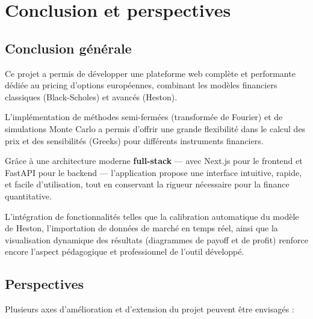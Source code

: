 \chapter*{Conclusion et perspectives}
\label{sec:conclusion}

\section*{Conclusion générale}

Ce projet a permis de développer une plateforme web complète et performante dédiée au pricing d'options européennes, combinant les modèles financiers classiques (Black-Scholes) et avancés (Heston). 

L'implémentation de méthodes semi-fermées (transformée de Fourier) et de simulations Monte Carlo a permis d'offrir une grande flexibilité dans le calcul des prix et des sensibilités (Greeks) pour différents instruments financiers.

Grâce à une architecture moderne \textbf{full-stack} — avec Next.js pour le frontend et FastAPI pour le backend — l'application propose une interface intuitive, rapide, et facile d'utilisation, tout en conservant la rigueur nécessaire pour la finance quantitative.

L'intégration de fonctionnalités telles que la calibration automatique du modèle de Heston, l'importation de données de marché en temps réel, ainsi que la visualisation dynamique des résultats (diagrammes de payoff et de profit) renforce encore l'aspect pédagogique et professionnel de l'outil développé.

\section*{Perspectives}

Plusieurs axes d'amélioration et d'extension du projet peuvent être envisagés :

